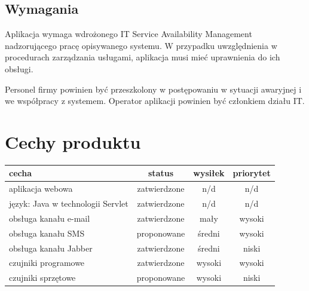\documentclass[a4paper,12pt]{article}
\begin{document}
\subsection{Wymagania}

Aplikacja wymaga wdrożonego IT Service Availability Management nadzorującego pracę opisywanego systemu.
W przypadku uwzględnienia w procedurach zarządzania usługami, aplikacja musi mieć uprawnienia do ich obsługi.

Personel firmy powinien być przeszkolony w postępowaniu w sytuacji awaryjnej i we współpracy z systemem.
Operator aplikacji powinien być członkiem działu IT.


\section{Cechy produktu}

\begin{center}
	\begin{tabular}{|l|c|c|c|}
	
		\hline
	
		\textbf{cecha} & \textbf{status} & \textbf{wysiłek} & \textbf{priorytet} \\
	
		\hline
	
		aplikacja webowa & zatwierdzone & n/d & n/d \\
	
		\hline

		język: Java w technologii Servlet & zatwierdzone & n/d & n/d \\

		\hline

		obsługa kanału e-mail & zatwierdzone & mały & wysoki \\
		
		\hline

		obsługa kanału SMS & proponowane & średni & wysoki \\
		
		\hline

		obsługa kanału Jabber & zatwierdzone & średni & niski \\
		
		\hline

		czujniki programowe & zatwierdzone & wysoki & wysoki \\
		
		\hline

		czujniki sprzętowe & proponowane & wysoki & niski \\
		
		\hline

	
	\end{tabular}
\end{center}
\end{document}
